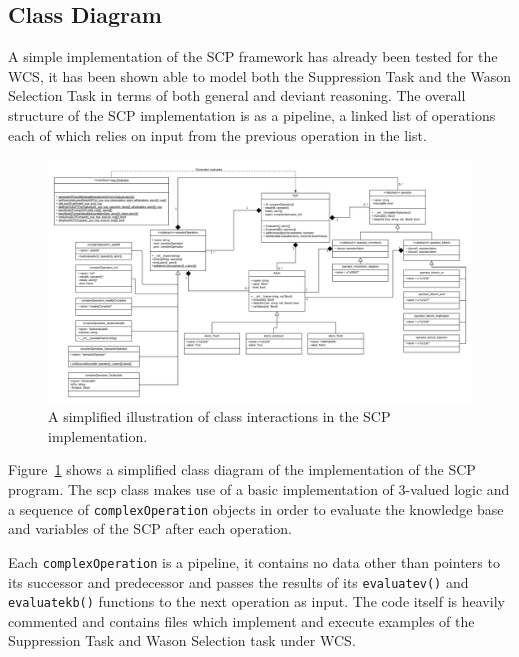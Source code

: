 \documentclass{article}
\begin{document}
\subsection{Class Diagram}
A simple implementation of the SCP framework has already been tested for the WCS, it has been shown able to model both the Suppression Task and the Wason Selection Task in terms of both general and deviant reasoning. The overall structure of the SCP implementation is as a pipeline, a linked list of operations each of which relies on input from the previous operation in the list.

\begin{figure}
    \centering \includegraphics[width=\textwidth]{scpClassDiagram}
    \caption{A simplified illustration of class interactions in the SCP implementation.}
    \label{fig:classDiagram}
\end{figure}

Figure~\ref{fig:classDiagram} shows a simplified class diagram of the implementation of the SCP program. The scp class makes use of a basic implementation of 3-valued logic and a sequence of \texttt{complexOperation} objects in order to evaluate the knowledge base and variables of the SCP after each operation.

Each \texttt{complexOperation} is a pipeline, it contains no data other than pointers to its successor and predecessor and passes the results of its \texttt{evaluatev()} and \texttt{evaluatekb()} functions to the next operation as input. The code itself is heavily commented and contains files which implement and execute examples of the Suppression Task and Wason Selection task under WCS.
\end{document}
